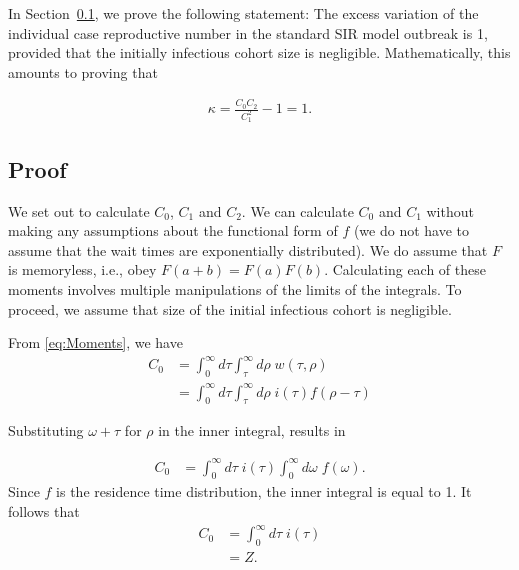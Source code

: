 In Section~\ref{proof_timeInf_initial0}, we prove the following statement:
The excess variation of the individual case reproductive number in the standard SIR model outbreak is 1, 
provided that the initially infectious cohort size is negligible.
Mathematically, this amounts to proving that

\begin{align}\label{eq:target}
\kappa= \frac{C_0C_2}{C_1^2} - 1 = 1.
\end{align}




\subsection{Proof} \label{proof_timeInf_initial0}
We set out to calculate $C_0$, $C_1$ and $C_2$. We can calculate $C_0$ and $C_1$ without making any assumptions about the functional form of $f$ (we do not have to assume that the wait times are exponentially distributed). We do assume that $F$ is memoryless, i.e., obey $F(a+b) = F(a)F(b)$.
Calculating each of these moments involves multiple manipulations of the limits of the integrals. 
To proceed, we assume that  size of the initial infectious cohort is negligible.

From \autoref{eq:Moments}, we have
\begin{align*}
        C_0 &= \int_0^\infty d\tau \int_\tau^\infty d\rho \; w(\tau,\rho) \\
        &= \int_0^\infty d\tau \int_\tau^\infty d\rho \; i(\tau) f(\rho - \tau)
\end{align*}

Substituting $\omega + \tau $ for $\rho$ in the inner integral, results in

\begin{align*}
        C_0 &=\int_0^\infty d\tau \;i(\tau) \int_0^\infty d\omega \; f(\omega).
\end{align*}
Since $f$ is the residence time distribution, the inner integral is equal to 1.
It follows that
\begin{align*}
        C_0 &=\int_0^\infty d\tau \;i(\tau) \\
        &= Z. 
\end{align*}

